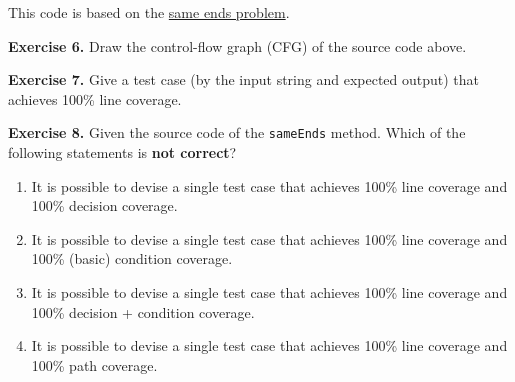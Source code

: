 \begin{Shaded}
\begin{Highlighting}[]
  \NormalTok{(}
 \NormalTok{();}
 \NormalTok{;}

 \NormalTok{;}
 \NormalTok{;}

 \NormalTok{;}
 \NormalTok{ (}

   
\NormalTok{();}
\NormalTok{      \}}
\NormalTok{    \}}

 \NormalTok{(}
\NormalTok{\}}
\end{Highlighting}
\end{Shaded}

This code is based on the \href{https://codingbat.com/prob/p131516}{same
ends problem}.

\textbf{Exercise 6.} Draw the control-flow graph (CFG) of the source
code above.

\textbf{Exercise 7.} Give a test case (by the input string and expected
output) that achieves 100\% line coverage.

\textbf{Exercise 8.} Given the source code of the \texttt{sameEnds}
method. Which of the following statements is \textbf{not correct}?

\begin{enumerate}
\def\labelenumi{\arabic{enumi}.}
\tightlist
\item
  It is possible to devise a single test case that achieves 100\% line
  coverage and 100\% decision coverage.
\item
  It is possible to devise a single test case that achieves 100\% line
  coverage and 100\% (basic) condition coverage.
\item
  It is possible to devise a single test case that achieves 100\% line
  coverage and 100\% decision + condition coverage.
\item
  It is possible to devise a single test case that achieves 100\% line
  coverage and 100\% path coverage.
\end{enumerate}

